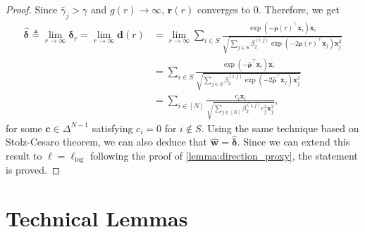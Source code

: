 \documentclass{article} %
\theoremstyle{plain}
\theoremstyle{definition}
\theoremstyle{remark}
\def\bdel{{\boldsymbol \delta}}
\def\bx{{\mathbf x}}
\def\bc{{\mathbf c}}
\def\bw{{\mathbf w}}
\def\bd{{\mathbf d}}
\begin{document}
\begin{proof}
    Since $\bar{\gamma}_j>\gamma$ and $g(r) \rightarrow \infty$, $\mathbf{r}(r)$ converges to 0. Therefore, we get
    \begin{align*}
      \hat{\bdel} \triangleq \lim_{r \rightarrow \infty} \boldsymbol{\delta}_r=\lim_{r \rightarrow \infty} \bd(r) &= \lim_{r \rightarrow \infty}\sum_{i \in S}\frac{\exp(-\boldsymbol{\rho}(r)^\top \mathbf{x}_i) \mathbf{x}_i}{\sqrt{\sum_{j \in S}\beta_2^{(i, j)}\exp(-2\boldsymbol{\rho}(r)^\top \mathbf{x}_j) \mathbf{x}_j^2}} \\
       &= \sum_{i \in S}\frac{\exp(-\hat{\boldsymbol{\rho}}^\top \mathbf{x}_i) \mathbf{x}_i}{\sqrt{\sum_{j \in S}\beta_2^{(i, j)}\exp(-2\hat{\boldsymbol{\rho}}^\top \mathbf{x}_j) \mathbf{x}_j^2}} \\
       &= \sum_{i\in[N]}\frac{ c_i\bx_i}{\sqrt{\sum_{j\in[N]} \beta_2^{(i, j)}c_j^2 \bx_j^2}},
    \end{align*}
    for some $\bc \in \Delta^{N-1}$ satisfying $c_i=0$ for $i \notin S$.
    Using the same technique based on Stolz-Cesaro theorem, we can also deduce that $\hat{\bw} = \hat{\bdel}$. Since we can extend this result to $\ell=\ell_{\text{log}}$ following the proof of \cref{lemma:direction_proxy}, the statement is proved.
\end{proof}

\section{Technical Lemmas} \label{appendix:technical}
\end{document}

